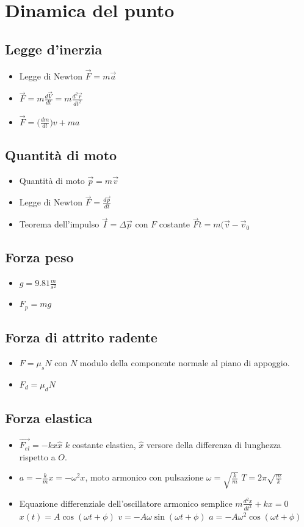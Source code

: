 \section{Dinamica del punto}
	\subsection{Legge d'inerzia}
	\begin{itemize}
		\item Legge di Newton $\overrightarrow{F} = m \overrightarrow{a}$
		\item $\overrightarrow{F} = m\frac{d\overrightarrow{V}}{dt} = m\frac{d^2\overrightarrow{r}}{dt^2}$
		\item $\overrightarrow{F} = \bigl(\frac{dm}{dt}\bigr)v+ma$
	\end{itemize}
	\subsection{Quantit\`a di moto}
	\begin{itemize}
		\item Quantit\`a di moto $\overrightarrow{p} = m\overrightarrow{v}$
		\item Legge di Newton $\overrightarrow{F} = \frac{d\overrightarrow{p}}{dt}$
		\item Teorema dell'impulso $\overrightarrow{I} = \Delta\overrightarrow{p}$ con $F$ costante $\overrightarrow{F}t = m(\overrightarrow{v} - \overrightarrow{v}_0$
	\end{itemize}
	\subsection{Forza peso}
	\begin{itemize}
		\item $g = 9.81\frac{m}{s^2}$
		\item $F_p = mg$
	\end{itemize}
	\subsection{Forza di attrito radente}
	\begin{itemize}
		\item $F = \mu_s N$ con $N$ modulo della componente normale al piano di appoggio.
		\item $F_d = \mu_dN$
	\end{itemize}
	\subsection{Forza elastica}
	\begin{itemize}
		\item $\overrightarrow{F_{el}} = -kx\hat{x}$ $k$ costante elastica, $\hat{x}$ versore della differenza di lunghezza rispetto a $O$.
		\item $a = -\frac{k}{m}x = -\omega^2 x$, moto armonico con pulsazione $\omega = \sqrt{\frac{k}{m}}$ $T = 2\pi\sqrt{\frac{m}{k}}$
		\item Equazione differenziale dell'oscillatore armonico semplice $m\frac{d^2x}{dt^2}+kx = 0$ $x(t) = A\cos(\omega t +\phi)$ $v = -A\omega\sin(\omega t+\phi)$ $a =-A\omega^2\cos(\omega t+\phi)$
	\end{itemize}
